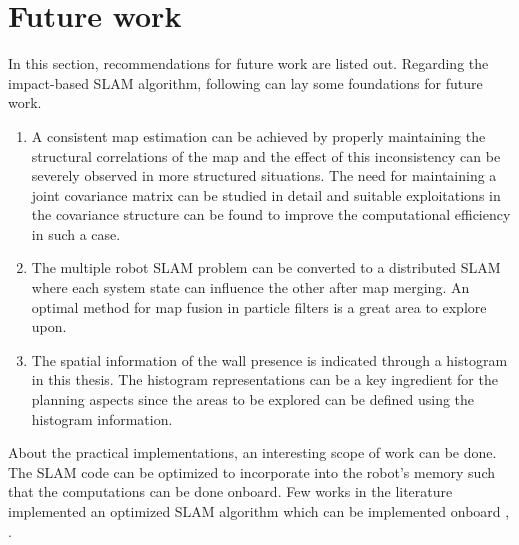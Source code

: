 \section{Future work}
In this section, recommendations for future work are listed out. Regarding the impact-based SLAM algorithm, following can lay some foundations for future work.
\begin{enumerate}
\item A consistent map estimation can be achieved by properly maintaining the structural correlations of the map and the effect of this inconsistency can be severely observed in more structured situations. The need for maintaining a joint covariance matrix can be studied in detail and suitable exploitations in the covariance structure can be found to improve the computational efficiency in such a case.
\item The multiple robot SLAM problem can be converted to a distributed SLAM where each system state can influence the other after map merging. An optimal method for map fusion in particle filters is a great area to explore upon.
\item The spatial information of the wall presence is indicated through a histogram in this thesis. The histogram representations can be a key ingredient for the planning aspects since the areas to be explored can be defined using the histogram information.  
\end{enumerate}

About the practical implementations, an interesting scope of work can be done. The SLAM code can be optimized to incorporate into the robot's memory such that the computations can be done onboard. Few works in the literature implemented an optimized SLAM algorithm which can be implemented onboard \cite{beevers2007mapping}, \cite{steux2010tinyslam}.